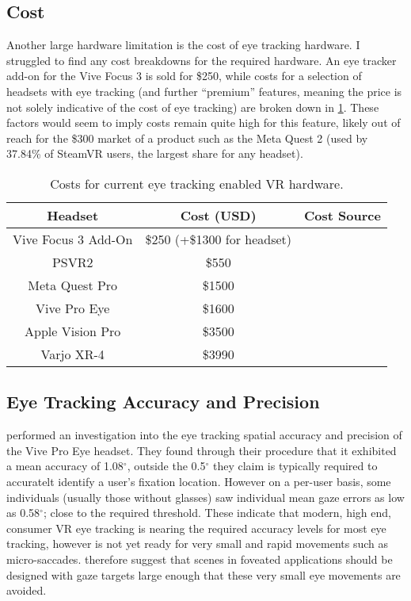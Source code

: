 \documentclass[a4paper,11pt]{article}
\begin{document}
\subsection{Cost}
Another large hardware limitation is the cost of eye tracking hardware. I struggled to find any cost breakdowns for the required hardware. An eye tracker add-on for the Vive Focus 3 is sold for \$250\cite{eye_cost_vive}, while costs for a selection of headsets with eye tracking (and further ``premium'' features, meaning the price is not solely indicative of the cost of eye tracking) are broken down in \cref{tab:costs}. These factors would seem to imply costs remain quite high for this feature, likely out of reach for the \$300\cite{quest_two_price} market of a product such as the Meta Quest 2 (used by 37.84\% of SteamVR users, the largest share for any headset).
\begin{table}
  \begin{center}
    \begin{tabular}{|c|c|c|}
      \hline
      Headset & Cost (USD) & Cost Source\\
      \hline
      Vive Focus 3 Add-On & \$250 (+\$1300 for headset) & \cite{eye_cost_vive, focus_price}\\
      \hline
       PSVR2 & \$550 & \cite{psvr_price}\\
       \hline
       Meta Quest Pro & \$1500 & \cite{quest_pro_price}\\
       \hline
       Vive Pro Eye & \$1600 & \cite{vive_pro_eye}\\
       \hline
       Apple Vision Pro & \$3500 & \cite{vision_pro_price}\\
       \hline
       Varjo XR-4 & \$3990 & \cite{varjo_price}\\
       \hline
    \end{tabular}
  \end{center}
  \caption{Costs for current eye tracking enabled VR hardware.}
  \label{tab:costs}
\end{table}

\subsection{Eye Tracking Accuracy and Precision}
\textcite{schuetz2022eye} performed an investigation into the eye tracking spatial accuracy and precision of the Vive Pro Eye headset. They found through their procedure that it exhibited a mean accuracy of 1.08$^{\circ}$, outside the 0.5$^{\circ}$ they claim is typically required to accuratelt identify a user's fixation location. However on a per-user basis, some individuals (usually those without glasses) saw individual mean gaze errors as low as 0.58$^{\circ}$; close to the required threshold. These indicate that modern, high end, consumer VR eye tracking is nearing the required accuracy levels for most eye tracking, however is not yet ready for very small and rapid movements such as micro-saccades. \textcite{schuetz2022eye} therefore suggest that scenes in foveated applications should be designed with gaze targets large enough that these very small eye movements are avoided.
\end{document}
